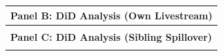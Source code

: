 \begin{landscape}
\begin{table}[!ht]
\begin{tabular}{l*{6}{c}}
          \multicolumn{7}{l}{\textbf{Panel B\@: DiD Analysis (Own Livestream)}} \\
          \midrule
          \\
          \midrule

          \multicolumn{7}{l}{\textbf{Panel C\@: DiD Analysis (Sibling Spillover)}} \\
          \midrule
          \\
          \bottomrule
      \end{tabular}

      \egroup%

    \end{table}

  \end{landscape}